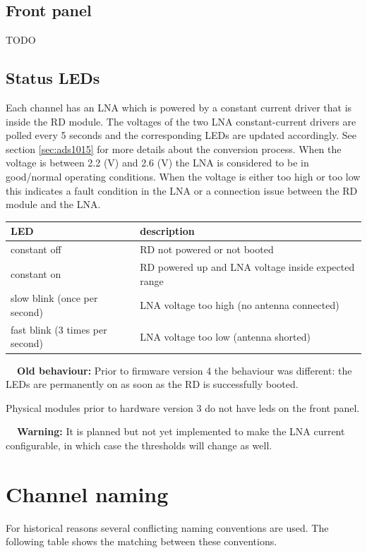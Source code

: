 \documentclass[a4paper,indent]{paper}
\newenvironment{warn}
{\par\begin{mdframed}[linewidth=2pt,linecolor=orange,backgroundcolor=orange!10]%
    \begin{list}{}{\leftmargin=0mm}\item[\bf\danger{}~~Warning: ]}
  {\end{list}\end{mdframed}\par}
\newenvironment{deprecation}
{\par\begin{mdframed}[linewidth=1pt,linecolor=black,backgroundcolor=black!10]%
    \begin{list}{}{\leftmargin=0mm}\item[\bf\danger{}~~Old behaviour: ]}
  {\end{list}\end{mdframed}\par}
\begin{document}
\subsection{Front panel}
TODO

\subsection{Status LEDs}

Each channel has an LNA which is powered by a constant current driver that is inside the RD module.
The voltages of the two LNA constant-current drivers are polled every 5 seconds and the corresponding LEDs are updated accordingly. See section \ref{sec:ads1015} for more details about the conversion process.
When the voltage is between 2.2 (V) and 2.6 (V) the LNA is considered to be in good/normal operating conditions. When the voltage is either too high or too low this indicates a fault condition in the LNA or a connection issue between the RD module and the LNA. 

  \begin{tabular}{l|l}
    LED & description \\\hline
    constant off & RD not powered or not booted \\
    constant on  & RD powered up and LNA voltage inside expected range \\
    slow blink (once per second) & LNA voltage too high (no antenna connected) \\
    fast blink (3 times per second) & LNA voltage too low (antenna shorted)\\
  \end{tabular}
  
\begin{deprecation}
  Prior to firmware version 4 the behaviour was different:
  the LEDs are permanently on as soon as the RD is successfully booted.

  Physical modules prior to hardware version 3 do not have leds on the front panel.
\end{deprecation}

\begin{warn}
  It is planned but not yet implemented to make the LNA current configurable, in which case the thresholds will change as well.
\end{warn}


\section{Channel naming}
For historical reasons several conflicting naming conventions are used. The following table shows the matching between these conventions.
\end{document}
